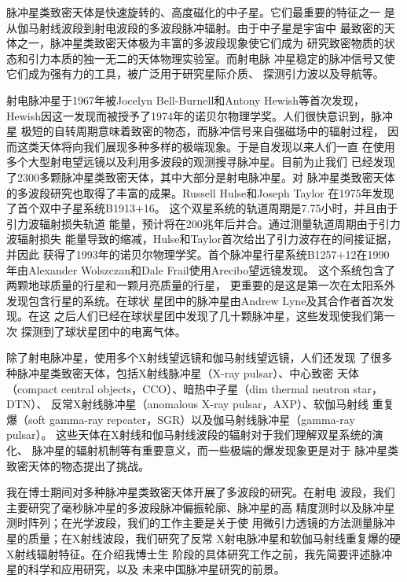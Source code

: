 

脉冲星类致密天体是快速旋转的、高度磁化的中子星。它们最重要的特征之一
是从伽马射线波段到射电波段的多波段脉冲辐射。由于中子星是宇宙中
最致密的天体之一，脉冲星类致密天体极为丰富的多波段现象使它们成为
研究致密物质的状态和引力本质的独一无二的天体物理实验室。而射电脉
冲星稳定的脉冲信号又使它们成为强有力的工具，被广泛用于研究星际介质、
探测引力波以及导航等。

射电脉冲星于1967年被Jocelyn Bell-Burnell和Antony Hewish等首次发现\supercite{hbp+68}，
Hewish因这一发现而被授予了1974年的诺贝尔物理学奖。人们很快意识到，脉冲星
极短的自转周期意味着致密的物态，而脉冲信号来自强磁场中的辐射过程，
因而这类天体将向我们展现多种多样的极端现象。于是自发现以来人们一直
在使用多个大型射电望远镜以及利用多波段的观测搜寻脉冲星。目前为止我们
已经发现了2300多颗脉冲星类致密天体，其中大部分是射电脉冲星。对
脉冲星类致密天体的多波段研究也取得了丰富的成果。Russell Hulse和Joseph Taylor
在1975年发现了首个双中子星系统B1913$+$16\supercite{ht75}。
这个双星系统的轨道周期是7.75小时，并且由于引力波辐射损失轨道
能量，预计将在200兆年后并合。通过测量轨道周期由于引力波辐射损失
能量导致的缩减，Hulse和Taylor首次给出了引力波存在的间接证据，并因此
获得了1993年的诺贝尔物理学奖。首个脉冲星行星系统B1257$+$12在1990
年由Alexander Wolszczan和Dale Frail使用Arecibo望远镜发现\supercite{wf92}。
这个系统包含了两颗地球质量的行星和一颗月亮质量的行星\supercite{wol94}，
更重要的是这是第一次在太阳系外发现包含行星的系统。在球状
星团中的脉冲星由Andrew Lyne及其合作者首次发现\supercite{lbm+87}。在这
之后人们已经在球状星团中发现了几十颗脉冲星，这些发现使我们第一次
探测到了球状星团中的电离气体\supercite{fkl+01}。

除了射电脉冲星，使用多个X射线望远镜和伽马射线望远镜，人们还发现
了很多种脉冲星类致密天体，包括X射线脉冲星（X-ray pulsar）、中心致密
天体（compact central objects，CCO）、暗热中子星（dim thermal neutron star，DTN）、
反常X射线脉冲星（anomalous X-ray pulsar，AXP）、软伽马射线
重复爆（soft gamma-ray repeater，SGR）以及伽马射线脉冲星（gamma-ray pulsar）。
这些天体在X射线和伽马射线波段的辐射对于我们理解双星系统的演化、
脉冲星的辐射机制等有重要意义，而一些极端的爆发现象更是对于
脉冲星类致密天体的物态提出了挑战\supercite{m08}。

我在博士期间对多种脉冲星类致密天体开展了多波段的研究。在射电
波段，我们主要研究了毫秒脉冲星的多波段脉冲偏振轮廓、脉冲星的高
精度测时以及脉冲星测时阵列；在光学波段，我们的工作主要是关于使
用微引力透镜的方法测量脉冲星的质量；在X射线波段，我们研究了反常
X射电脉冲星和软伽马射线重复爆的硬X射线辐射特征。在介绍我博士生
阶段的具体研究工作之前，我先简要评述脉冲星的科学和应用研究，以及
未来中国脉冲星研究的前景。

